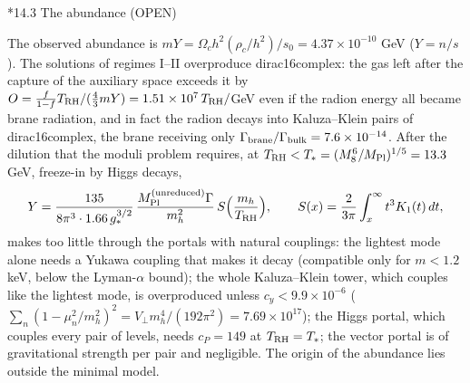 \documentclass[10pt,a4paper]{article}
\makeatletter
\renewcommand\subsection{\@startsection{subsection}{2}{\z@}{-3.25ex\@plus -1ex \@minus -.2ex}{1.5ex \@plus .2ex}{\normalfont\large\bfseries\raggedright}}
\makeatother
\begin{document}
\subsection*{14.3 The abundance (OPEN)}
The observed abundance is $mY=\Omega_ch^2(\rho_c/h^2)/s_0=4.37\times10^{-10}$ GeV ($Y=n/s$). The solutions of regimes I–II overproduce dirac16complex: the gas left after the capture of the auxiliary space exceeds it by $O=\frac f{1-f}T_{\rm RH}/(\frac43mY)=1.51\times10^{7}\,T_{\rm RH}/$GeV even if the radion energy all became brane radiation, and in fact the radion decays into Kaluza–Klein pairs of dirac16complex, the brane receiving only $\Gamma_{\rm brane}/\Gamma_{\rm bulk}=7.6\times10^{-14}$. After the dilution that the moduli problem requires, at $T_{\rm RH}<T_*=(M_8^6/M_{\rm Pl})^{1/5}=13.3$ GeV, freeze-in by Higgs decays,
\begin{equation*}
Y=\frac{135}{8\pi^3\cdot1.66\,g_*^{3/2}}\,\frac{M_{\rm Pl}^{\rm (unreduced)}\Gamma}{m_h^2}\,S\Big(\frac{m_h}{T_{\rm RH}}\Big),\qquad S(x)=\frac2{3\pi}\int_x^\infty t^3K_1(t)\,dt,
\end{equation*}
makes too little through the portals with natural couplings: the lightest mode alone needs a Yukawa coupling that makes it decay (compatible only for $m<1.2$ keV, below the Lyman-$\alpha$ bound); the whole Kaluza–Klein tower, which couples like the lightest mode, is overproduced unless $c_y<9.9\times10^{-6}$ ($\sum_n(1-\mu_n^2/m_h^2)^2=V_\perp m_h^4/(192\pi^2)=7.69\times10^{17}$); the Higgs portal, which couples every pair of levels, needs $c_P=149$ at $T_{\rm RH}=T_*$; the vector portal is of gravitational strength per pair and negligible. The origin of the abundance lies outside the minimal model.
\end{document}
